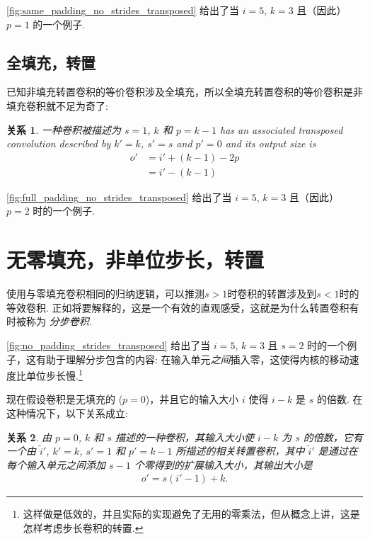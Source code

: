 \documentclass[notitlepage]{ctexrep}
\newtheorem{relationship}{关系}
\begin{document}
\autoref{fig:same_padding_no_strides_transposed} 给出了当 $i =
5$, $k = 3$ 且（因此） $p = 1$ 的一个例子.

\subsection{全填充，转置}

已知非填充转置卷积的等价卷积涉及全填充，所以全填充转置卷积的等价卷积是非填充卷积就不足为奇了:

\begin{relationship}\label{rel:full_padding_no_strides_transposed}
一种卷积被描述为 $s = 1$, $k$ 和 $p = k - 1$ has an
associated transposed convolution described by $k' = k$, $s' = s$ and $p' = 0$
and its output size is
\begin{equation*}
\begin{split}
    o' &= i' + (k - 1) - 2p \\
       &= i' - (k - 1)
\end{split}
\end{equation*}
\end{relationship}

\autoref{fig:full_padding_no_strides_transposed} 给出了当 $i =
5$, $k = 3$ 且（因此） $p = 2$ 时的一个例子.

\section{无零填充，非单位步长，转置}

使用与零填充卷积相同的归纳逻辑，可以推测$s>1$时卷积的转置涉及到$s<1$时的等效卷积. 
正如将要解释的，这是一个有效的直观感受，这就是为什么转置卷积有时被称为 {\em
分步卷积}.

\autoref{fig:no_padding_strides_transposed} 给出了当 $i = 5$, $k
= 3$ 且 $s = 2$ 时的一个例子，这有助于理解分步包含的内容: 在输入单元{\em 之间\/}插入零，这使得内核的移动速度比单位步长慢.\footnote{这样做是低效的，并且实际的实现避免了无用的零乘法，但从概念上讲，这是怎样考虑步长卷积的转置.}

现在假设卷积是无填充的 ($p = 0$)，并且它的输入大小 $i$ 使得 $i - k$ 是 $s$ 的倍数. 在这种情况下，以下关系成立:

\begin{relationship}\label{rel:no_padding_strides_transposed}
由 $p = 0$, $k$ 和 $s$ 描述的一种卷积，其输入大小使 $i - k$ 为 $s$ 的倍数，它有一个由 $\tilde{i}'$, $k' = k$, $s' = 1$ 和 $p' = k - 1$ 所描述的相关转置卷积，其中 $\tilde{i}'$ 是通过在每个输入单元之间添加 $s - 1$ 个零得到的扩展输入大小，其输出大小是
\begin{equation*}
\begin{split}
    o' = s (i' - 1) + k.
\end{split}
\end{equation*}
\end{relationship}
\end{document}
